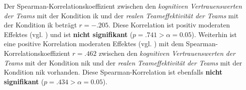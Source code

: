 \documentclass[a4paper,11pt]{article}%
\renewcommand{\\}{\vspace*{0.5\baselineskip} \newline}
\begin{document}
Der Spearman-Korrelationskoeffizient zwischen den \textit{kognitiven Vertrauenswerten der Teams} mit der Kondition \ac{ik} und der \textit{realen Teameffektivität der Teams} mit der Kondition \ac{ik} beträgt $r = -.205$. Diese Korrelation ist positiv moderaten Effektes (vgl. \citep{cohen2013statistical}) und ist \textbf{nicht signifikant} ($p = .741 > \alpha = 0.05$). \\
Weiterhin ist eine positive Korrelation moderaten Effektes (vgl. \citep{cohen2013statistical}) mit dem Spearman-Korrelationskoeffizient $r = .462$ zwischen den \textit{kognitiven Vertrauenswerten der Teams} mit der Kondition \ac{nik} und der \textit{realen Teameffektivität der Teams} mit der Kondition \ac{nik} vorhanden. Diese Spearman-Korrelation ist ebenfalls \textbf{nicht signifikant} ($p = .434 > \alpha = 0.05$).
\end{document}
